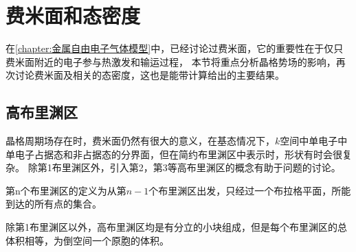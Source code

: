 
        \section{费米面和态密度}\label{section:费米面和态密度}
            在\autoref{chapter:金属自由电子气体模型}中，已经讨论过费米面，它的重要性在于仅只费米面附近的电子参与热激发和输运过程，
            本节将重点分析晶格势场的影响，再次讨论费米面及相关的态密度，这也是能带计算给出的主要结果。

            \subsection{高布里渊区}
                晶格周期场存在时，费米面仍然有很大的意义，在基态情况下，$k$空间中单电子中单电子占据态和非占据态的分界面，但在简约布里渊区中表示时，形状有时会很复杂。
                除第1布里渊区外，引入第2，第3等高布里渊区的概念有助于问题的讨论。

                第n个布里渊区的定义为从第$n-1$个布里渊区出发，只经过一个布拉格平面，所能到达的所有点的集合。

                除第1布里渊区以外，高布里渊区均是有分立的小块组成，但是每个布里渊区的总体积相等，为倒空间一个原胞的体积。

